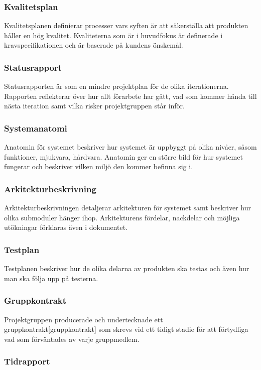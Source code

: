 \subsubsection*{Kvalitetsplan}
Kvalitetsplanen definierar processer vars syften är att säkerställa att produkten håller en hög kvalitet. Kvaliteterna som är i huvudfokus är definerade i kravspecifikationen och är baserade på kundens önskemål.

\subsubsection*{Statusrapport}
Statusrapporten är som en mindre projektplan för
de olika iterationerna. Rapporten reflekterar över hur allt förarbete har gått, vad som kommer
hända till nästa iteration samt vilka risker projektgruppen står inför.

\subsubsection*{Systemanatomi}
Anatomin för systemet beskriver hur systemet är uppbyggt på olika nivåer, såsom funktioner, 
mjukvara, hårdvara. Anatomin ger en större bild för hur systemet fungerar och beskriver vilken miljö den kommer
befinna sig i.

\subsubsection*{Arkitekturbeskrivning}
Arkitekturbeskrivningen detaljerar arkitekturen för systemet samt beskriver hur olika submoduler hänger ihop. Arkitekturens fördelar, nackdelar och möjliga utökningar förklaras även i dokumentet.

\subsubsection*{Testplan}
Testplanen beskriver hur de olika delarna av produkten ska testas och även hur man ska följa upp på testerna.

\subsubsection*{Gruppkontrakt}
Projektgruppen producerade och undertecknade ett gruppkontrakt[gruppkontrakt] som skrevs vid ett tidigt stadie för att förtydliga vad som förväntades av varje gruppmedlem.

\subsubsection*{Tidrapport}

